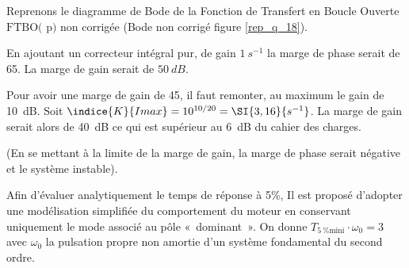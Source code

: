 Reprenons le diagramme de Bode de la Fonction de Transfert en Boucle Ouverte $\text{FTBO( p)}$ non corrigée (Bode non corrigé figure \ref{rep_q_18}).

\ifprof
\begin{corrige}
En ajoutant un correcteur intégral pur, de gain $\SI{1}{s^{-1}}$ la marge de phase serait de 65\degres. La marge de gain serait de $\SI{50}{dB}$. 

Pour avoir une marge de gain de 45\degres, il faut remonter, au maximum le gain de \SI{10}{dB}. Soit $\indice{K}{I max} = 10^{10/20}=\SI{3,16}{s^{-1}}$. La marge de gain serait alors de \SI{40}{dB} ce qui est supérieur au \SI{6}{dB} du cahier des charges. 

(En se mettant à la limite de la marge de gain, la marge de phase serait négative et le système instable).
\end{corrige}
\else
\fi

\ifprof
\else
Afin d’évaluer analytiquement le temps de réponse à 5\%, Il est proposé d’adopter une modélisation simplifiée du
comportement du moteur en conservant uniquement le mode associé au pôle «~dominant~». On donne $T_{\SI{5}{\%} \text{mini}}\cdot \omega_0 = 3$ avec $\omega_0$ la pulsation propre non amortie d’un système fondamental du second ordre.
\fi


